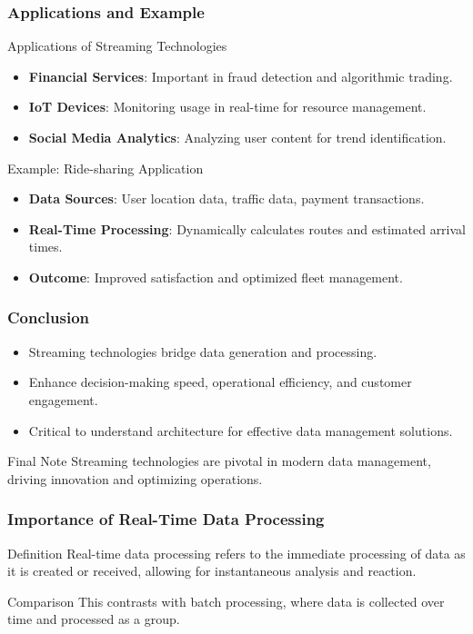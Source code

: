 \documentclass[aspectratio=169]{beamer}
\begin{document}
\begin{frame}[fragile]
    \frametitle{Applications and Example}
    \begin{block}{Applications of Streaming Technologies}
        \begin{itemize}
            \item \textbf{Financial Services}: Important in fraud detection and algorithmic trading.
            \item \textbf{IoT Devices}: Monitoring usage in real-time for resource management.
            \item \textbf{Social Media Analytics}: Analyzing user content for trend identification.
        \end{itemize}
    \end{block}

    \begin{block}{Example: Ride-sharing Application}
        \begin{itemize}
            \item \textbf{Data Sources}: User location data, traffic data, payment transactions.
            \item \textbf{Real-Time Processing}: Dynamically calculates routes and estimated arrival times.
            \item \textbf{Outcome}: Improved satisfaction and optimized fleet management.
        \end{itemize}
    \end{block}
\end{frame}

\begin{frame}[fragile]
    \frametitle{Conclusion}
    \begin{itemize}
        \item Streaming technologies bridge data generation and processing.
        \item Enhance decision-making speed, operational efficiency, and customer engagement.
        \item Critical to understand architecture for effective data management solutions.
    \end{itemize}

    \begin{block}{Final Note}
        Streaming technologies are pivotal in modern data management, driving innovation and optimizing operations.
    \end{block}
\end{frame}

\begin{frame}[fragile]
    \frametitle{Importance of Real-Time Data Processing}
    \begin{block}{Definition}
        Real-time data processing refers to the immediate processing of data as it is created or received, allowing for instantaneous analysis and reaction.
    \end{block}
    \begin{block}{Comparison}
        This contrasts with batch processing, where data is collected over time and processed as a group.
    \end{block}
\end{frame}
\end{document}
